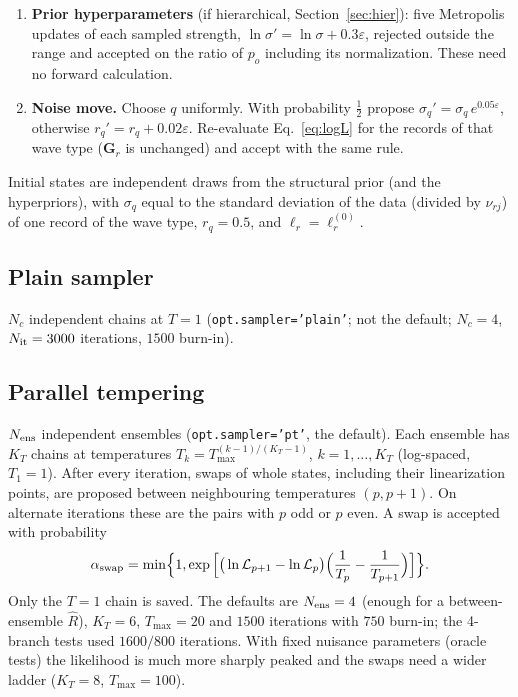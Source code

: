 \documentclass[11pt]{article}
\begin{document}
\begin{enumerate}
\begin{equation}
  \end{equation}
  Birth values come from the uniform prior and deaths are uniform, so the
  uniform-prior and proposal terms cancel; the optional priors $p_o$
  (Section~\ref{sec:optprior}) enter untempered, so they cancel in the
  parallel-tempering swaps. The $T^{1/4}$ factor widens the steps at high
  temperature.
\item \textbf{Prior hyperparameters} (if hierarchical, Section~\ref{sec:hier}):
  five Metropolis updates of each sampled strength,
  $\ln\sigma'=\ln\sigma+0.3\varepsilon$, rejected outside the range and
  accepted on the ratio of $p_o$ including its normalization. These need
  no forward calculation.
\item \textbf{Noise move.} Choose $q$ uniformly. With probability
  $\tfrac12$ propose $\sigma_q'=\sigma_q\,e^{0.05\varepsilon}$, otherwise
  $r_q'=r_q+0.02\varepsilon$. Re-evaluate Eq.~\eqref{eq:logL} for the
  records of that wave type ($\mathbf{G}_r$ is unchanged) and accept with
  the same rule.
\end{enumerate}
Initial states are independent draws from the structural prior (and the
hyperpriors), with $\sigma_q$ equal to the standard deviation of the data
(divided by $\nu_{rj}$) of one record of the wave type, $r_q=0.5$, and
$\bm\ell_r=\bm\ell^{(0)}_r$.

\subsection{Plain sampler}
$N_c$ independent chains at $T=1$ (\texttt{opt.sampler='plain'}; not the default;
$N_c=4$, $N_{\rm it}=3000$ iterations, $1500$ burn-in).

\subsection{Parallel tempering}
$N_{\rm ens}$ independent ensembles (\texttt{opt.sampler='pt'}, the default). Each
ensemble has $K_T$ chains at temperatures
$T_k=T_{\max}^{(k-1)/(K_T-1)}$, $k=1,\dots,K_T$ (log-spaced, $T_1=1$).
After every iteration, swaps of whole states, including their
linearization points, are proposed between neighbouring temperatures
$(p,p+1)$. On alternate iterations these are the pairs with $p$ odd or $p$
even. A swap is accepted with probability
\begin{equation}
 \alpha_{\rm swap}=\min\!\Big\{1,\exp\Big[\big(\ln\mathcal{L}_{p+1}-\ln\mathcal{L}_p\big)\Big(\frac1{T_p}-\frac1{T_{p+1}}\Big)\Big]\Big\}.
\end{equation}
Only the $T=1$ chain is saved. The defaults are $N_{\rm ens}=4$ (enough for a
between-ensemble $\hat R$), $K_T=6$, $T_{\max}=20$ and $1500$ iterations
with $750$ burn-in; the 4-branch tests used $1600/800$ iterations. With fixed nuisance
parameters (oracle tests) the likelihood is much more sharply peaked and
the swaps need a wider ladder ($K_T=8$, $T_{\max}=100$).
\end{document}

